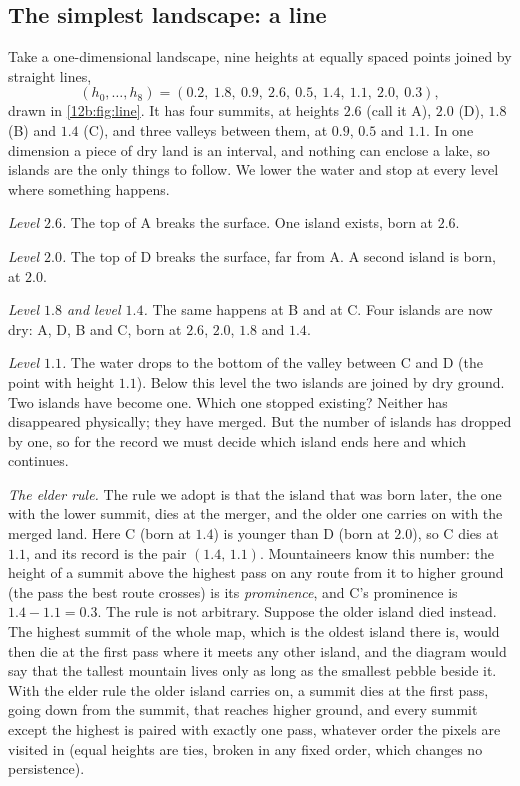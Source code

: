 \subsection{The simplest landscape: a line}
\label{12b:sec:line}

Take a one-dimensional landscape, nine heights at equally spaced points joined by straight lines,
\begin{equation}
  (h_0,\dots,h_8)=(0.2,\ 1.8,\ 0.9,\ 2.6,\ 0.5,\ 1.4,\ 1.1,\ 2.0,\ 0.3),
  \label{12b:eq:line}
\end{equation}
drawn in \cref{12b:fig:line}. It has four summits, at heights $2.6$ (call it A), $2.0$ (D), $1.8$ (B) and
$1.4$ (C), and three valleys between them, at $0.9$, $0.5$ and $1.1$. In one dimension a piece of dry land is
an interval, and nothing can enclose a lake, so islands are the only things to follow. We lower the water and
stop at every level where something happens.

\emph{Level $2.6$.} The top of A breaks the surface. One island exists, born at $2.6$.

\emph{Level $2.0$.} The top of D breaks the surface, far from A. A second island is born, at $2.0$.

\emph{Level $1.8$ and level $1.4$.} The same happens at B and at C. Four islands are now dry: A, D, B and C,
born at $2.6$, $2.0$, $1.8$ and $1.4$.

\emph{Level $1.1$.} The water drops to the bottom of the valley between C and D (the point with height $1.1$).
Below this level the two islands are joined by dry ground. Two islands have become one. Which one stopped
existing? Neither has disappeared physically; they have merged. But the number of islands has dropped by one,
so for the record we must decide which island ends here and which continues.

\emph{The elder rule.} The rule we adopt is that the island that was born later, the one with the lower
summit, dies at the merger, and the older one carries on with the merged land. Here C (born at $1.4$) is
younger than D (born at $2.0$), so C dies at $1.1$, and its record is the pair $(1.4,\,1.1)$. Mountaineers know
this number: the height of a summit above the highest pass on any route from it to higher ground (the pass the best route crosses) is its
\emph{prominence}, and C's prominence is $1.4-1.1=0.3$. The rule is not arbitrary. Suppose the older island died
instead. The highest summit of the whole map, which is the oldest island there is, would then die at the first pass
where it meets any other island, and the diagram would say that the tallest mountain lives only as long as the smallest
pebble beside it. With the elder rule the older island carries on, a summit dies at the first pass, going down from the summit, that reaches
higher ground, and every summit except the highest is paired with exactly one pass, whatever order the pixels are visited in (equal heights are ties, broken in any fixed
order, which changes no persistence).


